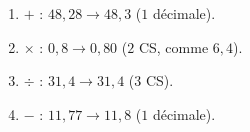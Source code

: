 \documentclass[11pt,a4paper]{article}
\begin{document}
\begin{corrige}
\begin{enumerate}[label=\alph*)]
  \item $+$ : $48,28 \to \boxed{48,3}$ ($1$ décimale).
  \item $\times$ : $0,8 \to \boxed{0,80}$ ($2$ CS, comme $6,4$).
  \item $\div$ : $31,4 \to \boxed{31,4}$ ($3$ CS).
  \item $-$ : $11,77 \to \boxed{11,8}$ ($1$ décimale).
\end{enumerate}
\end{corrige}
\end{document}
